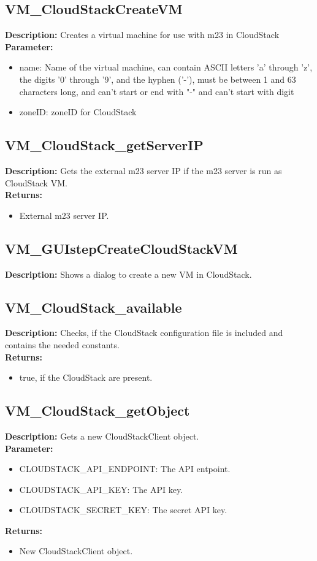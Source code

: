 \subsection{VM\_CloudStackCreateVM}
\textbf{Description:} Creates a virtual machine for use with m23 in CloudStack\\
\textbf{Parameter:}
\begin{itemize}
\item name: Name of the virtual machine, can contain ASCII letters 'a' through 'z', the digits '0' through '9', and the hyphen ('-'), must be between 1 and 63 characters long, and can't start or end with "-" and can't start with digit
\item zoneID: zoneID for CloudStack
\end{itemize}

\subsection{VM\_CloudStack\_getServerIP}
\textbf{Description:} Gets the external m23 server IP if the m23 server is run as CloudStack VM.\\
\textbf{Returns:}
\begin{itemize}
\item External m23 server IP.
\end{itemize}

\subsection{VM\_GUIstepCreateCloudStackVM}
\textbf{Description:} Shows a dialog to create a new VM in CloudStack.\\

\subsection{VM\_CloudStack\_available}
\textbf{Description:} Checks, if the CloudStack configuration file is included and contains the needed constants.\\
\textbf{Returns:}
\begin{itemize}
\item true, if the CloudStack are present.
\end{itemize}

\subsection{VM\_CloudStack\_getObject}
\textbf{Description:} Gets a new CloudStackClient object.\\
\textbf{Parameter:}
\begin{itemize}
\item CLOUDSTACK\_API\_ENDPOINT: The API entpoint.
\item CLOUDSTACK\_API\_KEY: The API key.
\item CLOUDSTACK\_SECRET\_KEY: The secret API key.
\end{itemize}
\textbf{Returns:}
\begin{itemize}
\item New CloudStackClient object.
\end{itemize}

